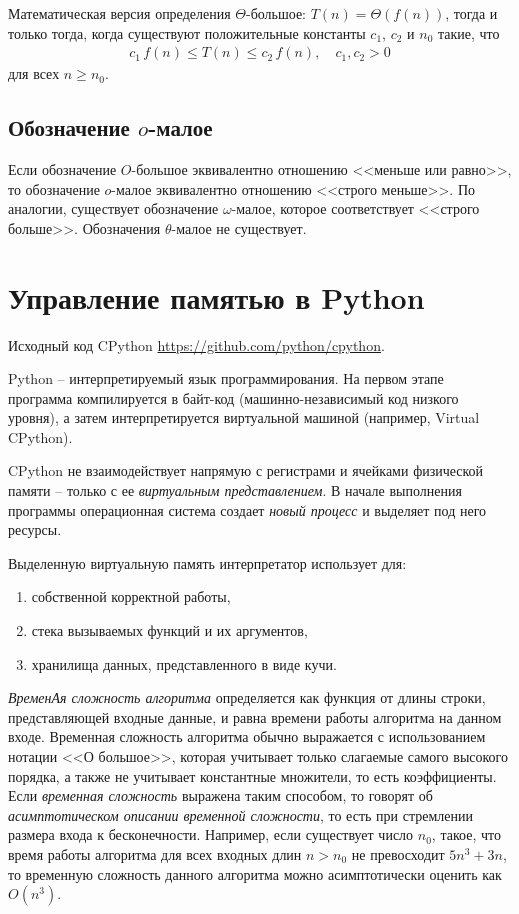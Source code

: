 \documentclass[%
	11pt,
	a4paper,
	utf8,
		]{article}
\begin{document}
Математическая версия определения $ \Theta $-большое: $ T(n) = \Theta(f(n)) $, тогда и только тогда, когда существуют положительные константы $ c_1 $, $ c_2 $ и $ n_0 $ такие, что
\begin{align*}
	c_1\,f(n) \leqslant T(n) \leqslant c_2\,f(n), \quad c_1, c_2 > 0
\end{align*}
для всех $ n \geqslant n_0 $.

\subsection{Обозначение $ o $-малое}

Если обозначение $ O $-большое эквивалентно отношению <<меньше или равно>>, то обозначение $ o $-малое эквивалентно отношению <<строго меньше>>. По аналогии, существует обозначение $\omega$-малое, которое соответствует <<строго больше>>. Обозначения $ \theta $-малое не существует.


\section{Управление памятью в Python}

Исходный код CPython \url{https://github.com/python/cpython}.

Python -- интерпретируемый язык программирования. На первом этапе программа компилируется в байт-код (машинно-независимый код низкого уровня), а затем интерпретируется виртуальной машиной (например, Virtual CPython).

CPython не взаимодействует напрямую с регистрами и ячейками  физической памяти -- только с ее \emph{виртуальным представлением}. В начале выполнения программы операционная система создает \emph{новый процесс} и выделяет под него ресурсы.

Выделенную виртуальную память интерпретатор использует для:
\begin{enumerate}
	\item собственной корректной работы,
	
	\item стека вызываемых функций и их аргументов,
	
	\item хранилища данных, представленного в виде кучи.
\end{enumerate}

\emph{ВременАя сложность алгоритма} определяется как функция от длины строки, представляющей входные данные, и равна времени работы алгоритма на данном входе. Временная сложность алгоритма обычно выражается с использованием нотации <<О большое>>, которая учитывает только слагаемые самого высокого порядка, а также не учитывает константные множители, то есть коэффициенты. Если \emph{временная сложность} выражена таким способом, то говорят об \emph{асимптотическом описании временной сложности}, то есть при стремлении размера входа к бесконечности. Например, если существует число $ n_0 $, такое, что время работы алгоритма для всех входных длин $ n > n_0 $ не превосходит $ 5 n^3 + 3 n $, то временную сложность данного алгоритма можно асимптотически оценить как $ O(n^3) $.
\end{document}
